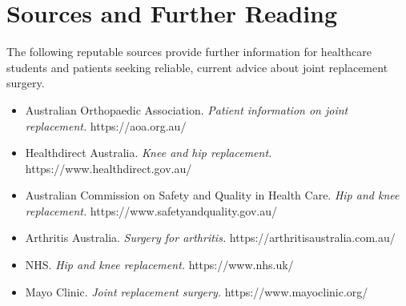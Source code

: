 \section*{Sources and Further Reading}
The following reputable sources provide further information for healthcare students and patients seeking reliable, current advice about joint replacement surgery.
\begin{itemize}
    \item Australian Orthopaedic Association. \textit{Patient information on joint replacement.} https://aoa.org.au/
    \item Healthdirect Australia. \textit{Knee and hip replacement.} https://www.healthdirect.gov.au/
    \item Australian Commission on Safety and Quality in Health Care. \textit{Hip and knee replacement.} https://www.safetyandquality.gov.au/
    \item Arthritis Australia. \textit{Surgery for arthritis.} https://arthritisaustralia.com.au/
    \item NHS. \textit{Hip and knee replacement.} https://www.nhs.uk/
    \item Mayo Clinic. \textit{Joint replacement surgery.} https://www.mayoclinic.org/
\end{itemize}
